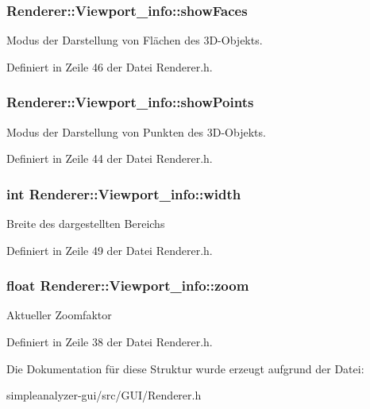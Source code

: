 \hypertarget{structRenderer_1_1Viewport__info_aa1f3f4b18210cf0bc69df0c9015e8acf}{
\subsubsection[{show\-Faces}]{ Renderer\-::\-Viewport\-\_\-info\-::show\-Faces}}\label{structRenderer_1_1Viewport__info_aa1f3f4b18210cf0bc69df0c9015e8acf}
Modus der Darstellung von Flächen des 3\-D-\/\-Objekts. 

Definiert in Zeile 46 der Datei Renderer.\-h.

\hypertarget{structRenderer_1_1Viewport__info_ab95af83b6e3e068e14b37187a11709b7}{
\subsubsection[{show\-Points}]{ Renderer\-::\-Viewport\-\_\-info\-::show\-Points}}\label{structRenderer_1_1Viewport__info_ab95af83b6e3e068e14b37187a11709b7}
Modus der Darstellung von Punkten des 3\-D-\/\-Objekts. 

Definiert in Zeile 44 der Datei Renderer.\-h.

\hypertarget{structRenderer_1_1Viewport__info_af0617337cfe95f9d5a21420335474bea}{
\subsubsection[{width}]{\setlength{\rightskip}{0pt plus 5cm}int Renderer\-::\-Viewport\-\_\-info\-::width}}\label{structRenderer_1_1Viewport__info_af0617337cfe95f9d5a21420335474bea}
Breite des dargestellten Bereichs 

Definiert in Zeile 49 der Datei Renderer.\-h.

\hypertarget{structRenderer_1_1Viewport__info_a9bbc5e50fed7334fb237e620e6080e5e}{
\subsubsection[{zoom}]{\setlength{\rightskip}{0pt plus 5cm}float Renderer\-::\-Viewport\-\_\-info\-::zoom}}\label{structRenderer_1_1Viewport__info_a9bbc5e50fed7334fb237e620e6080e5e}
Aktueller Zoomfaktor 

Definiert in Zeile 38 der Datei Renderer.\-h.



Die Dokumentation für diese Struktur wurde erzeugt aufgrund der Datei\-:\begin{DoxyCompactItemize}
\item 
simpleanalyzer-\/gui/src/\-G\-U\-I/Renderer.\-h\end{DoxyCompactItemize}

